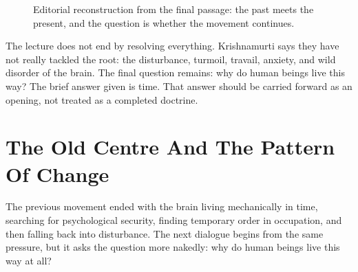 \documentclass[11pt,oneside]{book}
\begin{document}
\begin{figure}
\centering
{}
\caption{Editorial reconstruction from the final passage: the past meets the present, and the question is whether the movement continues.}
\end{figure}

The lecture does not end by resolving everything. Krishnamurti says they have not really tackled the root: the disturbance, turmoil, travail, anxiety, and wild disorder of the brain. The final question remains: why do human beings live this way? The brief answer given is time. That answer should be carried forward as an opening, not treated as a completed doctrine.


\chapter{The Old Centre And The Pattern Of Change}

The previous movement ended with the brain living mechanically in time, searching for psychological security, finding temporary order in occupation, and then falling back into disturbance. The next dialogue begins from the same pressure, but it asks the question more nakedly: why do human beings live this way at all?
\end{document}
